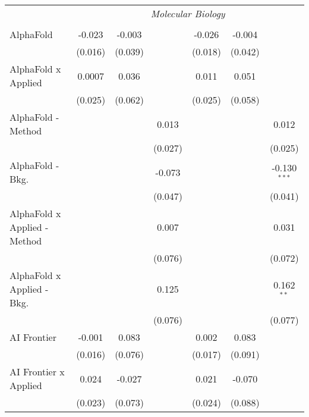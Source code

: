 \begin{tabular}{lcccccc}
 & \multicolumn{6}{c}{\textit{Molecular Biology}} \\ \\
   AlphaFold                      & -0.023      & -0.003  &                & -0.026       & -0.004        &   \\   
                                  & (0.016)     & (0.039) &                & (0.018)      & (0.042)       &   \\   
   AlphaFold x Applied            & 0.0007      & 0.036   &                & 0.011        & 0.051         &   \\   
                                  & (0.025)     & (0.062) &                & (0.025)      & (0.058)       &   \\   
   AlphaFold - Method             &             &         & 0.013          &              &               & 0.012\\   
                                  &             &         & (0.027)        &              &               & (0.025)\\   
   AlphaFold - Bkg.               &             &         & -0.073         &              &               & -0.130$^{***}$\\   
                                  &             &         & (0.047)        &              &               & (0.041)\\   
   AlphaFold x Applied - Method   &             &         & 0.007          &              &               & 0.031\\   
                                  &             &         & (0.076)        &              &               & (0.072)\\   
   AlphaFold x Applied - Bkg.     &             &         & 0.125          &              &               & 0.162$^{**}$\\   
                                  &             &         & (0.076)        &              &               & (0.077)\\   
   AI Frontier                    & -0.001      & 0.083   &                & 0.002        & 0.083         &   \\   
                                  & (0.016)     & (0.076) &                & (0.017)      & (0.091)       &   \\   
   AI Frontier x Applied          & 0.024       & -0.027  &                & 0.021        & -0.070        &   \\   
                                  & (0.023)     & (0.073) &                & (0.024)      & (0.088)       &   \\   

\end{tabular}
